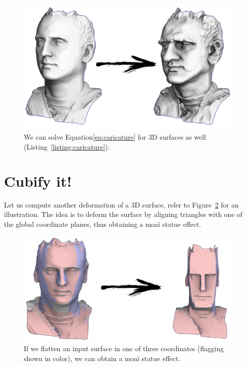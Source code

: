 \documentclass[notitlepage,oneside]{book}
\begin{document}
\begin{figure}[ht]
    \centering
    \includegraphics[width=\linewidth]{img/caricature.jpg}
    \caption{We can solve Equation\eqref{eq:caricature} for 3D surfaces as well (Listing~\ref{listing:caricature}).}
    \label{fig:caricature}
\end{figure}

\newpage
\section{Cubify it!}
\label{sec:cubify}
Let us compute another deformation of a 3D surface, refer to Figure~\ref{fig:moai} for an illustration.
The idea is to deform the surface by aligning triangles with one of the global coordinate planes, thus obtaining a moaï statue effect.
\begin{figure}[!h]
	\centering
	\includegraphics[width=.75\linewidth]{img/cubify-flagging.jpg}
	\caption{If we flatten an input surface in one of three coordinates (flagging shown in color), we can obtain a moaï statue effect.}
	\label{fig:moai}
\end{figure}
\end{document}
